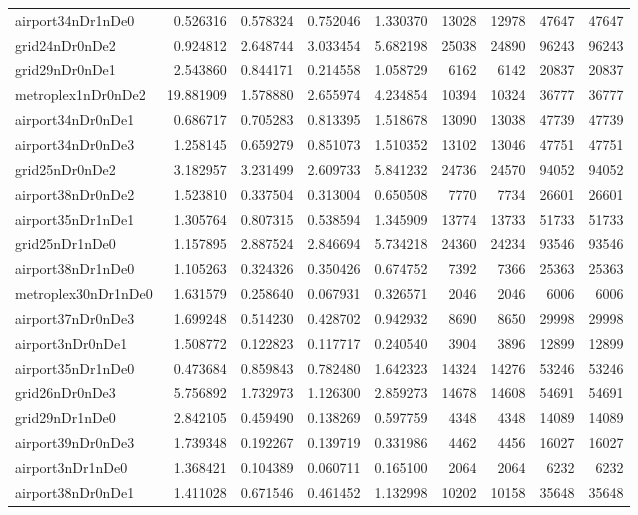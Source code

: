 \begin{longtable}{|l|r|r|r|r|r|r|r|r|}
airport34nDr1nDe0 & 0.526316 & 0.578324 & 0.752046 & 1.330370 & 13028 & 12978 & 47647 & 47647 \\
grid24nDr0nDe2 & 0.924812 & 2.648744 & 3.033454 & 5.682198 & 25038 & 24890 & 96243 & 96243 \\
grid29nDr0nDe1 & 2.543860 & 0.844171 & 0.214558 & 1.058729 & 6162 & 6142 & 20837 & 20837 \\
metroplex1nDr0nDe2 & 19.881909 & 1.578880 & 2.655974 & 4.234854 & 10394 & 10324 & 36777 & 36777 \\
airport34nDr0nDe1 & 0.686717 & 0.705283 & 0.813395 & 1.518678 & 13090 & 13038 & 47739 & 47739 \\
airport34nDr0nDe3 & 1.258145 & 0.659279 & 0.851073 & 1.510352 & 13102 & 13046 & 47751 & 47751 \\
grid25nDr0nDe2 & 3.182957 & 3.231499 & 2.609733 & 5.841232 & 24736 & 24570 & 94052 & 94052 \\
airport38nDr0nDe2 & 1.523810 & 0.337504 & 0.313004 & 0.650508 & 7770 & 7734 & 26601 & 26601 \\
airport35nDr1nDe1 & 1.305764 & 0.807315 & 0.538594 & 1.345909 & 13774 & 13733 & 51733 & 51733 \\
grid25nDr1nDe0 & 1.157895 & 2.887524 & 2.846694 & 5.734218 & 24360 & 24234 & 93546 & 93546 \\
airport38nDr1nDe0 & 1.105263 & 0.324326 & 0.350426 & 0.674752 & 7392 & 7366 & 25363 & 25363 \\
metroplex30nDr1nDe0 & 1.631579 & 0.258640 & 0.067931 & 0.326571 & 2046 & 2046 & 6006 & 6006 \\
airport37nDr0nDe3 & 1.699248 & 0.514230 & 0.428702 & 0.942932 & 8690 & 8650 & 29998 & 29998 \\
airport3nDr0nDe1 & 1.508772 & 0.122823 & 0.117717 & 0.240540 & 3904 & 3896 & 12899 & 12899 \\
airport35nDr1nDe0 & 0.473684 & 0.859843 & 0.782480 & 1.642323 & 14324 & 14276 & 53246 & 53246 \\
grid26nDr0nDe3 & 5.756892 & 1.732973 & 1.126300 & 2.859273 & 14678 & 14608 & 54691 & 54691 \\
grid29nDr1nDe0 & 2.842105 & 0.459490 & 0.138269 & 0.597759 & 4348 & 4348 & 14089 & 14089 \\
airport39nDr0nDe3 & 1.739348 & 0.192267 & 0.139719 & 0.331986 & 4462 & 4456 & 16027 & 16027 \\
airport3nDr1nDe0 & 1.368421 & 0.104389 & 0.060711 & 0.165100 & 2064 & 2064 & 6232 & 6232 \\
airport38nDr0nDe1 & 1.411028 & 0.671546 & 0.461452 & 1.132998 & 10202 & 10158 & 35648 & 35648 \\

\end{longtable}
